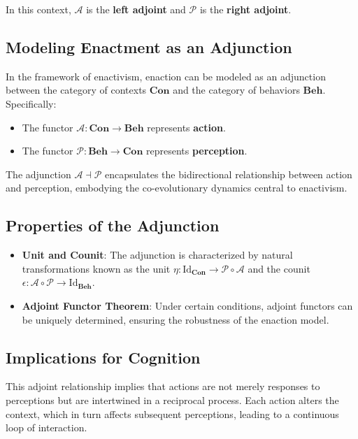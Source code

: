 \documentclass{article}
\begin{document}
In this context, $\mathcal{A}$ is the \textbf{left adjoint} and $\mathcal{P}$ is the \textbf{right adjoint}.

\subsection{Modeling Enactment as an Adjunction}

In the framework of enactivism, enaction can be modeled as an adjunction between the category of contexts $\mathbf{Con}$ and the category of behaviors $\mathbf{Beh}$. Specifically:

\begin{itemize}
    \item The functor $\mathcal{A} \colon \mathbf{Con} \to \mathbf{Beh}$ represents \textbf{action}.
    \item The functor $\mathcal{P} \colon \mathbf{Beh} \to \mathbf{Con}$ represents \textbf{perception}.
\end{itemize}

The adjunction $\mathcal{A} \dashv \mathcal{P}$ encapsulates the bidirectional relationship between action and perception, embodying the co-evolutionary dynamics central to enactivism.

\subsection{Properties of the Adjunction}

\begin{itemize}
    \item \textbf{Unit and Counit}: The adjunction is characterized by natural transformations known as the unit $\eta \colon \text{Id}_{\mathbf{Con}} \to \mathcal{P} \circ \mathcal{A}$ and the counit $\epsilon \colon \mathcal{A} \circ \mathcal{P} \to \text{Id}_{\mathbf{Beh}}$.
    \item \textbf{Adjoint Functor Theorem}: Under certain conditions, adjoint functors can be uniquely determined, ensuring the robustness of the enaction model.
\end{itemize}

\subsection{Implications for Cognition}

This adjoint relationship implies that actions are not merely responses to perceptions but are intertwined in a reciprocal process. Each action alters the context, which in turn affects subsequent perceptions, leading to a continuous loop of interaction.
\end{document}
